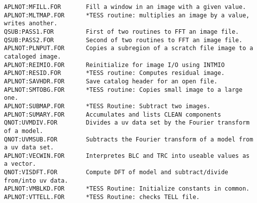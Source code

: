 \begin{verbatim}
APLNOT:MFILL.FOR       Fill a window in an image with a given value.
APLNOT:MLTMAP.FOR      *TESS routine: multiplies an image by a value, writes another.
QSUB:PASS1.FOR         First of two routines to FFT an image file.
QSUB:PASS2.FOR         Second of two routines to FFT an image file.
APLNOT:PLNPUT.FOR      Copies a subregion of a scratch file image to a cataloged image.
APLNOT:REIMIO.FOR      Reinitialize for image I/O using INTMIO
APLNOT:RESID.FOR       *TESS routine: Computes residual image.
APLNOT:SAVHDR.FOR      Save catalog header for an open file.
APLNOT:SMTOBG.FOR      *TESS routine: Copies small image to a large one.
APLNOT:SUBMAP.FOR      *TESS Routine: Subtract two images.
APLNOT:SUMARY.FOR      Accumulates and lists CLEAN components
QNOT:UVMDIV.FOR        Divides a uv data set by the Fourier transform of a model.
QNOT:UVMSUB.FOR        Subtracts the Fourier transform of a model from a uv data set.
APLNOT:VECWIN.FOR      Interpretes BLC and TRC into useable values as a vector.
QNOT:VISDFT.FOR        Compute DFT of model and subtract/divide from/into uv data.
APLNOT:VMBLKD.FOR      *TESS Routine: Initialize constants in common.
APLNOT:VTTELL.FOR      *TESS Routine: checks TELL file.
\end{verbatim}
 

